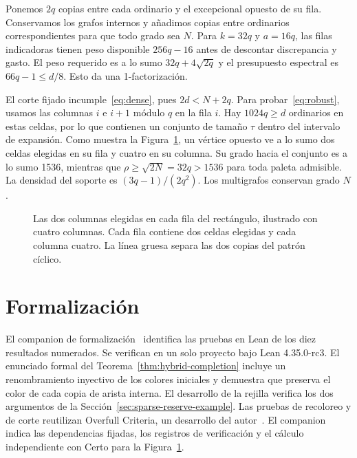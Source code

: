\documentclass[11pt]{article}
\begin{document}
Ponemos \(2q\) copias entre cada ordinario y el excepcional opuesto de su fila. Conservamos los grafos internos y añadimos copias entre ordinarios correspondientes para que todo grado sea \(N\). Para \(k=32q\) y \(a=16q\), las filas indicadoras tienen peso disponible \(256q-16\) antes de descontar discrepancia y gasto. El peso requerido es a lo sumo \(32q+4\sqrt{2q}\) y el presupuesto espectral es \(66q-1\le d/8\). Esto da una 1-factorización.

El corte fijado incumple~\eqref{eq:dense}, pues \(2d<N+2q\). Para probar~\eqref{eq:robust}, usamos las columnas \(i\) e \(i+1\) módulo \(q\) en la fila \(i\). Hay \(1024q\ge d\) ordinarios en estas celdas, por lo que contienen un conjunto de tamaño \(\tau\) dentro del intervalo de expansión. Como muestra la Figura~\ref{fig:rectangle}, un vértice opuesto ve a lo sumo dos celdas elegidas en su fila y cuatro en su columna. Su grado hacia el conjunto es a lo sumo 1536, mientras que \(\rho\ge\sqrt{2N}=32q>1536\) para toda paleta admisible. La densidad del soporte es \((3q-1)/(2q^2)\). Los multigrafos conservan grado \(N\).

\begin{figure}[ht]
\centering
{}
\caption{Las dos columnas elegidas en cada fila del rectángulo, ilustrado con cuatro columnas. Cada fila contiene dos celdas elegidas y cada columna cuatro. La línea gruesa separa las dos copias del patrón cíclico.}\label{fig:rectangle}
\end{figure}




\section{Formalización}

El companion de formalización~\cite{WECRCompanion} identifica las pruebas en Lean de los diez resultados numerados. Se verifican en un solo proyecto bajo Lean 4.35.0-rc3. El enunciado formal del Teorema~\ref{thm:hybrid-completion} incluye un renombramiento inyectivo de los colores iniciales y demuestra que preserva el color de cada copia de arista interna. El desarrollo de la rejilla verifica los dos argumentos de la Sección~\ref{sec:sparse-reserve-example}. Las pruebas de recoloreo y de corte reutilizan Overfull Criteria, un desarrollo del autor~\cite{TraversoOverfull}. El companion indica las dependencias fijadas, los registros de verificación y el cálculo independiente con Certo para la Figura~\ref{fig:rectangle}.
\end{document}
